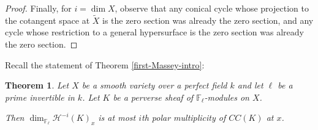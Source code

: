 \documentclass[12pt]{amsart}
\newtheorem{theorem}{Theorem}[section]
\theoremstyle{definition}
\theoremstyle{remark}
\newcommand{\inhyper}[1] {\tilde{#1}}
\begin{document}
\begin{proof}
 
 Finally, for $i = \dim X$, observe that any conical cycle whose projection to the cotangent space at $\inhyper{X}$ is the zero section was already the zero section, and any cycle whose restriction to a general hypersurface is the zero section was already the zero section.

\end{proof}



Recall the statement of Theorem \ref{first-Massey-intro}:

\begin{theorem}\label{first-Massey}Let $X$ be a smooth variety over a perfect field $k$ and let $\ell$ be a prime invertible in $k$. Let $K$ be a perverse sheaf of $\mathbb F_\ell$-modules on $X$. 

Then $\dim_{\mathbb F_\ell} \mathcal H^{-i}(K)_x$ is at most $i$th polar multiplicity of $CC(K)$ at $x$.  \end{theorem}
\end{document}

